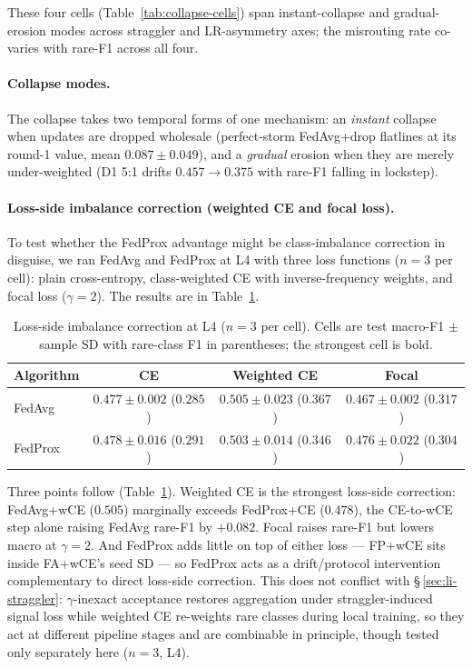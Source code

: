 \documentclass[11pt,a4paper]{report}
\begin{document}
\noindent
These four cells (Table~\ref{tab:collapse-cells}) span instant-collapse and
gradual-erosion modes across straggler and LR-asymmetry axes; the misrouting
rate co-varies with rare-F1 across all four.


\paragraph{Collapse modes.}

The collapse takes two temporal forms of one mechanism: an \emph{instant}
collapse when updates are dropped wholesale (perfect-storm FedAvg+drop flatlines
at its round-1 value, mean $0.087 \pm 0.049$), and a \emph{gradual} erosion when
they are merely under-weighted (D1 5:1 drifts $0.457 \to 0.375$ with rare-F1
falling in lockstep).


\paragraph{Loss-side imbalance correction (weighted CE and focal loss).}

To test whether the FedProx advantage might be class-imbalance correction
in disguise, we ran FedAvg and FedProx at L4 with three loss functions
($n=3$ per cell): plain cross-entropy, class-weighted CE with
inverse-frequency weights, and focal loss ($\gamma = 2$). The results are
in Table~\ref{tab:loss-side}.

\begin{table}[H]
\centering
\caption{Loss-side imbalance correction at L4 ($n=3$ per cell). Cells are
test macro-F1 $\pm$ sample SD with rare-class F1 in parentheses; the strongest
cell is bold.}
\label{tab:loss-side}
\begin{tabular}{lccc}
\toprule
Algorithm & CE & Weighted CE & Focal \\
\midrule
FedAvg  & $0.477 \pm 0.002$ ($0.285$) & $\mathbf{0.505 \pm 0.023}$ ($\mathbf{0.367}$) & $0.467 \pm 0.002$ ($0.317$) \\
FedProx & $0.478 \pm 0.016$ ($0.291$) & $0.503 \pm 0.014$ ($0.346$)                   & $0.476 \pm 0.022$ ($0.304$) \\
\bottomrule
\end{tabular}
\end{table}

Three points follow (Table~\ref{tab:loss-side}). Weighted CE is the strongest
loss-side correction: FedAvg+wCE ($0.505$) marginally exceeds FedProx+CE
($0.478$), the CE-to-wCE step alone raising FedAvg rare-F1 by $+0.082$. Focal
raises rare-F1 but lowers macro at $\gamma=2$. And FedProx adds little on top of
either loss --- FP+wCE sits inside FA+wCE's seed SD --- so FedProx acts as a
drift/protocol intervention complementary to direct loss-side correction.
This does not conflict with \S\,\ref{sec:li-straggler}: $\gamma$-inexact acceptance
restores aggregation under straggler-induced signal loss while weighted CE
re-weights rare classes during local training, so they act at different pipeline
stages and are combinable in principle, though tested only separately here
($n=3$, L4).
\end{document}
